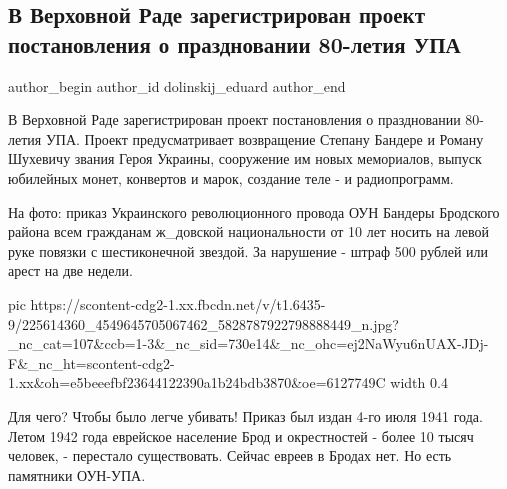  
 
 
 
 
 
\subsection{В Верховной Раде зарегистрирован проект постановления о праздновании 80-летия УПА}
\label{sec:28_07_2021.fb.dolinskij_eduard.1.foto_oun_upa_listovka_evrei}
 
\ifcmt
 author_begin
   author_id dolinskij_eduard
 author_end
\fi

В Верховной Раде зарегистрирован проект постановления о праздновании 80-летия
УПА. Проект предусматривает возвращение Степану Бандере и Роману Шухевичу
звания Героя Украины, сооружение им новых мемориалов, выпуск юбилейных монет,
конвертов и марок, создание теле - и радиопрограмм. 

На фото: приказ Украинского революционного провода ОУН Бандеры Бродского района
всем гражданам ж\_довской национальности от 10 лет носить на левой руке повязки
с шестиконечной звездой. За нарушение - штраф 500 рублей или арест на две
недели. 

\ifcmt
  pic https://scontent-cdg2-1.xx.fbcdn.net/v/t1.6435-9/225614360_4549645705067462_5828787922798888449_n.jpg?_nc_cat=107&ccb=1-3&_nc_sid=730e14&_nc_ohc=ej2NaWyu6nUAX-JDj-F&_nc_ht=scontent-cdg2-1.xx&oh=e5beeefbf23644122390a1b24bdb3870&oe=6127749C
  width 0.4
\fi

Для чего? Чтобы было легче убивать! Приказ был издан 4-го июля 1941 года. Летом
1942 года еврейское население Брод и окрестностей - более 10 тысяч человек, -
перестало существовать. Сейчас евреев в Бродах нет. Но есть памятники ОУН-УПА.

